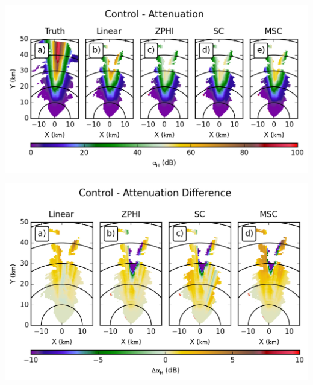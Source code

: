 \documentclass[red]{beamer}
\begin{document}
\begin{frame}
    \begin{center}
        \includegraphics[scale=0.7]{figures/spatial/X_Control_Attenuation_H}
    \end{center}
\end{frame}

\begin{frame}
    \begin{center}
        \includegraphics[scale=0.7]{figures/spatial/X_Control_Attenuation_Difference_H}
    \end{center}
\end{frame}
\end{document}
